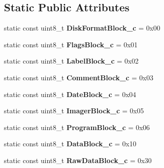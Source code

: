 \subsection*{Static Public Attributes}
\begin{DoxyCompactItemize}
\item 
\hypertarget{classH17Block_a2c0bb47f26439845bada4b36ad517a19}{}static const uint8\+\_\+t {\bfseries Disk\+Format\+Block\+\_\+c} = 0x00\label{classH17Block_a2c0bb47f26439845bada4b36ad517a19}

\item 
\hypertarget{classH17Block_a321d17f4fa4f0c3bae07903dc9d63e89}{}static const uint8\+\_\+t {\bfseries Flags\+Block\+\_\+c} = 0x01\label{classH17Block_a321d17f4fa4f0c3bae07903dc9d63e89}

\item 
\hypertarget{classH17Block_a665b016e0c21812300c78e27bd27cacc}{}static const uint8\+\_\+t {\bfseries Label\+Block\+\_\+c} = 0x02\label{classH17Block_a665b016e0c21812300c78e27bd27cacc}

\item 
\hypertarget{classH17Block_a7e113d95265854d65ee7cfd9b8036bb4}{}static const uint8\+\_\+t {\bfseries Comment\+Block\+\_\+c} = 0x03\label{classH17Block_a7e113d95265854d65ee7cfd9b8036bb4}

\item 
\hypertarget{classH17Block_a6533f08296fa7781ab424014c53d0339}{}static const uint8\+\_\+t {\bfseries Date\+Block\+\_\+c} = 0x04\label{classH17Block_a6533f08296fa7781ab424014c53d0339}

\item 
\hypertarget{classH17Block_a6d3c62d3bb52383b0d42c96a0edf084e}{}static const uint8\+\_\+t {\bfseries Imager\+Block\+\_\+c} = 0x05\label{classH17Block_a6d3c62d3bb52383b0d42c96a0edf084e}

\item 
\hypertarget{classH17Block_a82d84c0c8a48dd51d2aa81a2bb25b388}{}static const uint8\+\_\+t {\bfseries Program\+Block\+\_\+c} = 0x06\label{classH17Block_a82d84c0c8a48dd51d2aa81a2bb25b388}

\item 
\hypertarget{classH17Block_ae6f576b907f36413c246f4d0121f81a2}{}static const uint8\+\_\+t {\bfseries Data\+Block\+\_\+c} = 0x10\label{classH17Block_ae6f576b907f36413c246f4d0121f81a2}

\item 
\hypertarget{classH17Block_a40da95004bf44a8b227e58d273de483f}{}static const uint8\+\_\+t {\bfseries Raw\+Data\+Block\+\_\+c} = 0x30\label{classH17Block_a40da95004bf44a8b227e58d273de483f}


\end{DoxyCompactItemize}
